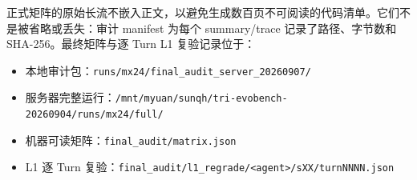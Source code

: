 \documentclass[11pt,a4paper]{article}
\newcommand{\code}[1]{\texttt{#1}}
\begin{document}
正式矩阵的原始长流不嵌入正文，以避免生成数百页不可阅读的代码清单。它们不是被省略或丢失：审计 manifest 为每个 summary/trace 记录了路径、字节数和 SHA-256。最终矩阵与逐 Turn L1 复验记录位于：

\begin{itemize}
\item 本地审计包：\code{runs/mx24/final\_audit\_server\_20260907/}
\item 服务器完整运行：\code{/mnt/myuan/sunqh/tri-evobench-20260904/runs/mx24/full/}
\item 机器可读矩阵：\code{final\_audit/matrix.json}
\item L1 逐 Turn 复验：\code{final\_audit/l1\_regrade/<agent>/sXX/turnNNNN.json}
\end{itemize}
\end{document}
